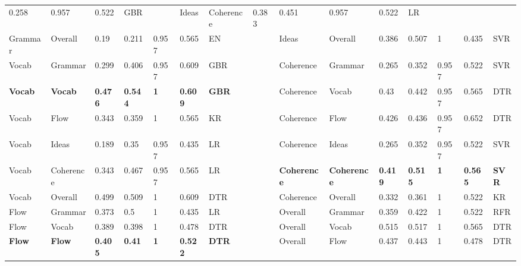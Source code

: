 \begin{table}[h]
{\begin{tabular}{@{}lllllllllllllll@{}}
  0.258 &
  0.957 &
  0.522 &
  GBR &
  &
  Ideas &
  Coherence &
  0.383 &
  0.451 &
  0.957 &
  0.522 &
  LR \\
Grammar &
  Overall &
  0.19 &
  0.211 &
  0.957 &
  0.565 &
  EN &
  &
  Ideas &
  Overall &
  0.386 &
  0.507 &
  1 &
  0.435 &
  SVR \\
Vocab &
  Grammar &
  0.299 &
  0.406 &
  0.957 &
  0.609 &
  GBR &
  &
  Coherence &
  Grammar &
  0.265 &
  0.352 &
  0.957 &
  0.522 &
  SVR \\
\cellcolor[HTML]{EFEFEF}\textbf{Vocab} &
  \cellcolor[HTML]{EFEFEF}\textbf{Vocab} &
  \cellcolor[HTML]{EFEFEF}\textbf{0.476} &
  \cellcolor[HTML]{EFEFEF}\textbf{0.544} &
  \cellcolor[HTML]{EFEFEF}\textbf{1} &
  \cellcolor[HTML]{EFEFEF}\textbf{0.609} &
  \cellcolor[HTML]{EFEFEF}\textbf{GBR} &
  &
  Coherence &
  Vocab &
  0.43 &
  0.442 &
  0.957 &
  0.565 &
  DTR \\
Vocab &
  Flow &
  0.343 &
  0.359 &
  1 &
  0.565 &
  KR &
  &
  Coherence &
  Flow &
  0.426 &
  0.436 &
  0.957 &
  0.652 &
  DTR \\
Vocab &
  Ideas &
  0.189 &
  0.35 &
  0.957 &
  0.435 &
  LR &
  &
  Coherence &
  Ideas &
  0.265 &
  0.352 &
  0.957 &
  0.522 &
  SVR \\
Vocab &
  Coherence &
  0.343 &
  0.467 &
  0.957 &
  0.565 &
  LR &
  &
  \cellcolor[HTML]{EFEFEF}\textbf{Coherence} &
  \cellcolor[HTML]{EFEFEF}\textbf{Coherence} &
  \cellcolor[HTML]{EFEFEF}\textbf{0.419} &
  \cellcolor[HTML]{EFEFEF}\textbf{0.515} &
  \cellcolor[HTML]{EFEFEF}\textbf{1} &
  \cellcolor[HTML]{EFEFEF}\textbf{0.565} &
  \cellcolor[HTML]{EFEFEF}\textbf{SVR} \\
Vocab &
  Overall &
  0.499 &
  0.509 &
  1 &
  0.609 &
  DTR &
  &
  Coherence &
  Overall &
  0.332 &
  0.361 &
  1 &
  0.522 &
  KR \\
Flow &
  Grammar &
  0.373 &
  0.5 &
  1 &
  0.435 &
  LR &
  &
  Overall &
  Grammar &
  0.359 &
  0.422 &
  1 &
  0.522 &
  RFR \\
Flow &
  Vocab &
  0.389 &
  0.398 &
  1 &
  0.478 &
  DTR &
  &
  Overall &
  Vocab &
  0.515 &
  0.517 &
  1 &
  0.565 &
  DTR \\
\cellcolor[HTML]{EFEFEF}\textbf{Flow} &
  \cellcolor[HTML]{EFEFEF}\textbf{Flow} &
  \cellcolor[HTML]{EFEFEF}\textbf{0.405} &
  \cellcolor[HTML]{EFEFEF}\textbf{0.41} &
  \cellcolor[HTML]{EFEFEF}\textbf{1} &
  \cellcolor[HTML]{EFEFEF}\textbf{0.522} &
  \cellcolor[HTML]{EFEFEF}\textbf{DTR} &
  &
  Overall &
  Flow &
  0.437 &
  0.443 &
  1 &
  0.478 &
  DTR \\

\end{tabular}}
\end{table}
